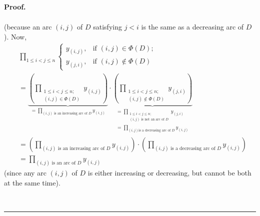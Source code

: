\documentclass[numbers=enddot,12pt,final,onecolumn,notitlepage]{scrartcl}%
\numberwithin{exer}{subsection}
\theoremstyle{definition}
\newenvironment{fineprint}{\begin{small}}{\end{small}}
\newenvironment{proof}[1][Proof]{\noindent\textbf{#1.} }{\ \rule{0.5em}{0.5em}}
\let\prodnonlimits\prod
\renewcommand{\prod}{\prodnonlimits\limits}
\begin{document}
\begin{proof}
\begin{fineprint}
\begin{align*}
\end{align*}
(because an arc $\left(  i,j\right)  $ of $D$ satisfying $j<i$ is the same as
a decreasing arc of $D$). Now,%
\begin{align}
&  \prod_{1\leq i<j\leq n}%
\begin{cases}
y_{\left(  i,j\right)  }, & \text{if }\left(  i,j\right)  \in\Phi\left(
D\right)  ;\\
y_{\left(  j,i\right)  }, & \text{if }\left(  i,j\right)  \notin\Phi\left(
D\right)
\end{cases}
\nonumber\\
&  =\underbrace{\left(  \prod_{\substack{1\leq i<j\leq n;\\\left(  i,j\right)
\in\Phi\left(  D\right)  }}y_{\left(  i,j\right)  }\right)  }_{=\prod_{\left(
i,j\right)  \text{ is an increasing arc of }D}y_{\left(  i,j\right)  }}%
\cdot\underbrace{\left(  \prod_{\substack{1\leq i<j\leq n;\\\left(
i,j\right)  \notin\Phi\left(  D\right)  }}y_{\left(  j,i\right)  }\right)
}_{\substack{=\prod_{\substack{1\leq i<j\leq n;\\\left(  i,j\right)  \text{ is
not an arc of }D}}y_{\left(  j,i\right)  }\\=\prod_{\left(  i,j\right)  \text{
is a decreasing arc of }D}y_{\left(  i,j\right)  }}}\nonumber\\
&  =\left(  \prod_{\left(  i,j\right)  \text{ is an increasing arc of }%
D}y_{\left(  i,j\right)  }\right)  \cdot\left(  \prod_{\left(  i,j\right)
\text{ is a decreasing arc of }D}y_{\left(  i,j\right)  }\right) \nonumber\\
&  =\prod_{\left(  i,j\right)  \text{ is an arc of }D}y_{\left(  i,j\right)  }
\label{pf.lem.tour1n.prody.7}%
\end{align}
(since any arc $\left(  i,j\right)  $ of $D$ is either increasing or
decreasing, but cannot be both at the same time).


\end{fineprint}
\end{proof}
\end{document}
